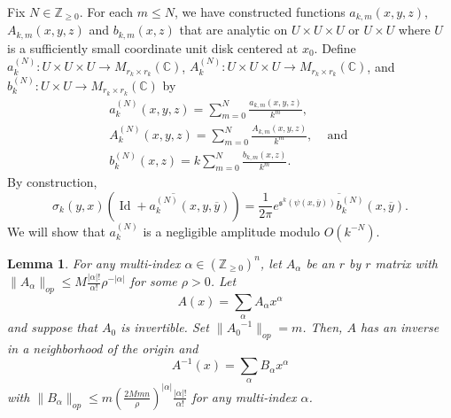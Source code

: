 \documentclass{amsart}
\newtheorem{lem}[thm]{Lemma}
\theoremstyle{definition}
\theoremstyle{remark}
\numberwithin{equation}{section}
\DeclareMathOperator{\Id}{Id}
\begin{document}
Fix $N \in \mathbb{Z}_{\geq 0}$. For each $m \leq N$, we have constructed functions $a_{k,m}(x,y,z)$, $A_{k,m}(x,y,z)$ and $b_{k,m}(x,z)$ that are analytic on $U\times U \times U$ or $U\times U$ where $U$ is a sufficiently small coordinate unit disk centered at $x_0$. Define $a^{(N)}_k:U \times U \times U \to M_{r_k \times r_k}(\mathbb{C})$, $A^{(N)}_k : U \times U \times U \to M_{r_k \times r_k}(\mathbb{C})$, and $b_k^{(N)} : U \times U \to M_{r_k \times r_k}(\mathbb{C})$ by 
\begin{gather*}
a^{(N)}_k(x,y,z) = \sum_{m=0}^N  \frac{a_{k,m}(x,y,z)}{k^m},  \\
A^{(N)}_k(x,y,z) = \sum_{m=0}^N  \frac{A_{k,m}(x,y,z)}{k^m},\hspace{10pt} \text{ and } \\
b_k^{(N)}(x,z) = k \sum_{m=0}^N \frac{b_{k,m}(x,z)}{k^{m}}.
\end{gather*}
By construction,
\begin{equation} \label{eqn: b_k id}
\sigma_k(y,x)\left ( \overline{\Id + a_k^{(N)}(x,y,\overline{y})} \right ) = \frac{1}{2\pi} \overline{ e^{\mathfrak{s}^k(\psi(x,\overline{y}))}b_k^{(N)}(x,\overline{y})} .
\end{equation}
We will show that $a^{(N)}_k$ is a negligible amplitude modulo $O(k^{-N})$.






\begin{lem} \label{lem: inverse}
For any multi-index $\alpha \in \left (\mathbb{Z}_{\geq 0} \right )^n$, let $A_\alpha$ be an $r$ by $r$ matrix with $\|A_\alpha\|_{op} \leq M \frac{|\alpha|!}{\alpha!} \rho^{-|\alpha|}$ for some $\rho > 0$. Let
$$
A(x) = \sum_{\alpha} A_\alpha x^\alpha
$$
and suppose that $A_0$ is invertible. Set $\|{A_0}^{-1}\|_{op} = m$. Then, $A$ has an inverse in a neighborhood of the origin and
$$
A^{-1}(x) = \sum_{\alpha} B_\alpha x^\alpha
$$
with $\|B_\alpha\|_{op} \leq m \left ( \frac{2 M m n}{\rho} \right )^{|\alpha|} \frac{ |\alpha|!}{\alpha!}$ for any multi-index $\alpha$.
\end{lem}
\end{document}
